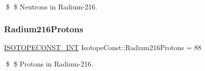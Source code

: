 \$ \$ Neutrons in Radium-\/216. \mbox{\label{group___isotope_const-_radium-_ra216_ga3c53264fd00ce20750a9ce19b7cc46cc}} 
\subsubsection{\texorpdfstring{Radium216\+Protons}{Radium216Protons}}
{\footnotesize\ttfamily \mbox{\hyperlink{group___isotope_const-_macros_ga5f18360b3e99483a35c32d789e62621c}{I\+S\+O\+T\+O\+P\+E\+C\+O\+N\+S\+T\+\_\+\+I\+NT}} Isotope\+Const\+::\+Radium216\+Protons = 88}

\$ \$ Protons in Radium-\/216. 